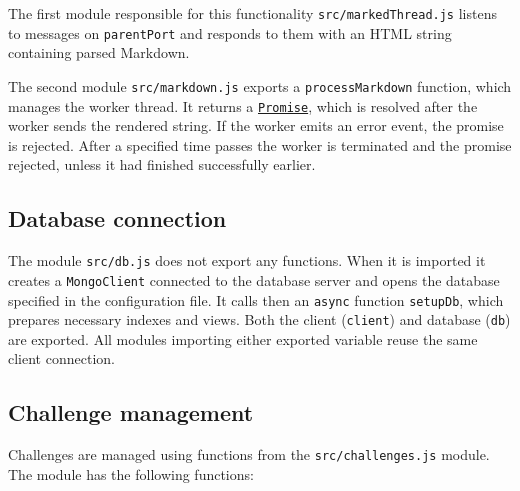 The first module responsible for this functionality \texttt{src/markedThread.js} listens to messages on \texttt{parentPort} and responds to them with an HTML string containing parsed Markdown.

The second module \texttt{src/markdown.js} exports a \texttt{processMarkdown} function, which manages the worker thread. It returns a \href{https://tc39.es/ecma262/multipage/control-abstraction-objects.html#sec-promise-objects}{\texttt{Promise}}, which is resolved after the worker sends the rendered string. If the worker emits an error event, the promise is rejected. After a specified time passes the worker is terminated and the promise rejected, unless it had finished successfully earlier.

\subsection{Database connection}

The module \texttt{src/db.js} does not export any functions. When it is imported it creates a \texttt{MongoClient} connected to the database server and opens the database specified in the configuration file. It calls then an \texttt{async} function \texttt{setupDb}, which prepares necessary indexes and views. Both the client (\texttt{client}) and database (\texttt{db}) are exported. All modules importing either exported variable reuse the same client connection.

\subsection{Challenge management}

Challenges are managed using functions from the \texttt{src/challenges.js} module. The module has the following functions:

